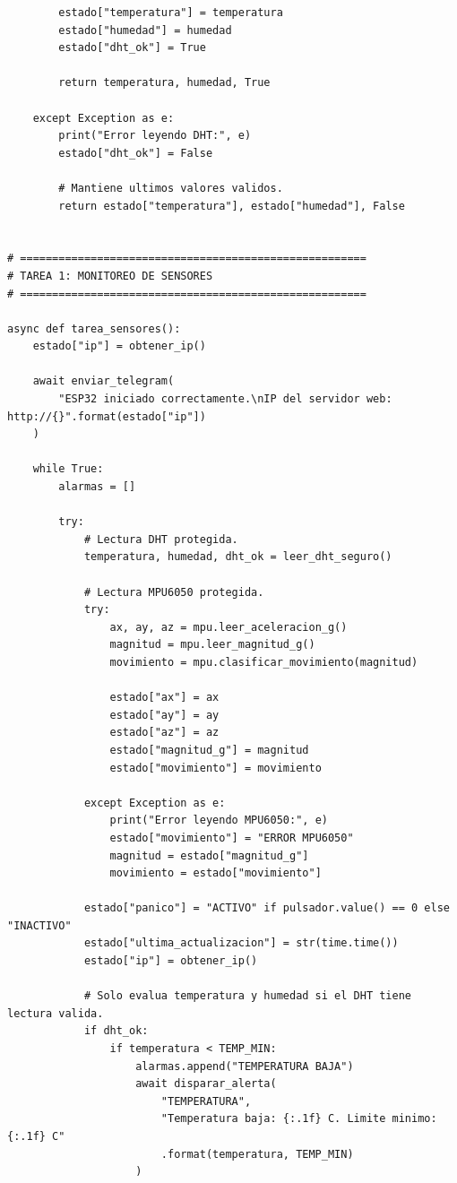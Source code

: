 \documentclass[12pt]{article}
\begin{document}
\begin{lstlisting}
        estado["temperatura"] = temperatura
        estado["humedad"] = humedad
        estado["dht_ok"] = True

        return temperatura, humedad, True

    except Exception as e:
        print("Error leyendo DHT:", e)
        estado["dht_ok"] = False

        # Mantiene ultimos valores validos.
        return estado["temperatura"], estado["humedad"], False


# ======================================================
# TAREA 1: MONITOREO DE SENSORES
# ======================================================

async def tarea_sensores():
    estado["ip"] = obtener_ip()

    await enviar_telegram(
        "ESP32 iniciado correctamente.\nIP del servidor web: http://{}".format(estado["ip"])
    )

    while True:
        alarmas = []

        try:
            # Lectura DHT protegida.
            temperatura, humedad, dht_ok = leer_dht_seguro()

            # Lectura MPU6050 protegida.
            try:
                ax, ay, az = mpu.leer_aceleracion_g()
                magnitud = mpu.leer_magnitud_g()
                movimiento = mpu.clasificar_movimiento(magnitud)

                estado["ax"] = ax
                estado["ay"] = ay
                estado["az"] = az
                estado["magnitud_g"] = magnitud
                estado["movimiento"] = movimiento

            except Exception as e:
                print("Error leyendo MPU6050:", e)
                estado["movimiento"] = "ERROR MPU6050"
                magnitud = estado["magnitud_g"]
                movimiento = estado["movimiento"]

            estado["panico"] = "ACTIVO" if pulsador.value() == 0 else "INACTIVO"
            estado["ultima_actualizacion"] = str(time.time())
            estado["ip"] = obtener_ip()

            # Solo evalua temperatura y humedad si el DHT tiene lectura valida.
            if dht_ok:
                if temperatura < TEMP_MIN:
                    alarmas.append("TEMPERATURA BAJA")
                    await disparar_alerta(
                        "TEMPERATURA",
                        "Temperatura baja: {:.1f} C. Limite minimo: {:.1f} C"
                        .format(temperatura, TEMP_MIN)
                    )


\end{lstlisting}
\end{document}
